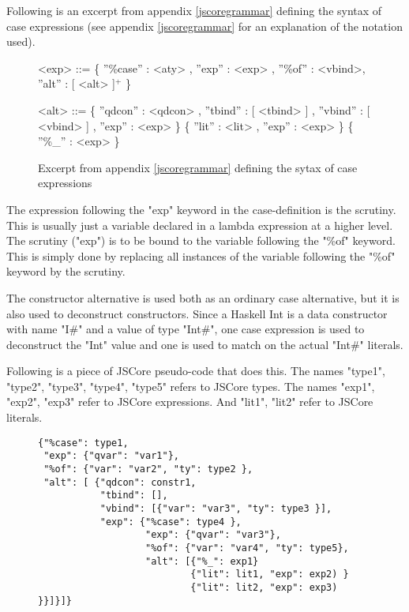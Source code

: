 Following is an excerpt from appendix \ref{jscoregrammar} defining the syntax 
of case expressions (see appendix \ref{jscoregrammar} for an explanation of the
notation used).

\begin{figure}[H]
\scriptsize
\begin{grammar}

<exp>		  ::= 	 \{ ''\%case'' : <aty> , ''exp'' : <exp> , ''\%of'' : <vbind>, ''alt'' : [ <alt> ]$^{+}$ \}	

<alt>		  ::= 	 \{ ''qdcon'' : <qdcon> , ''tbind'' : [ <tbind> ] , ''vbind'' : [ <vbind> ] , ''exp'' : <exp> \}
		  \alt 			 \{ ''lit'' : <lit> , ''exp'' : <exp> \}
		  \alt 			 \{ ''\%\_'' : <exp> \}	
\end{grammar}

\label{caseexpr}
\caption{Excerpt from appendix \ref{jscoregrammar} defining the sytax of case expressions}
\end{figure}

The expression following the "exp" keyword in the case-definition is the scrutiny. This
is usually just a variable declared in a lambda expression at a higher level.
The scrutiny ("exp") is to be bound to the variable following the "\%of" keyword.
This is simply done by replacing all instances of the variable following the "\%of" keyword
by the scrutiny.

The constructor alternative is used both as an ordinary case alternative, but it is
also used to deconstruct constructors. Since a Haskell Int is a data
constructor with name "I\#" and a value of type "Int\#", one case expression is used 
to deconstruct the "Int" value and one is used to match on the actual "Int\#" literals.

Following is a piece of JSCore pseudo-code that does this. 
The names "type1", "type2", "type3", "type4", "type5" refers to JSCore types. 
The names "exp1", "exp2", "exp3" refer to JSCore expressions. And "lit1", "lit2" refer
to JSCore literals.

\begin{figure}[H]
\lstset{ %
language=Haskell,
caption=JSCore case expression,
label=lst:int1
}
\begin{lstlisting}
{"%case": type1,
 "exp": {"qvar": "var1"},
 "%of": {"var": "var2", "ty": type2 },
 "alt": [ {"qdcon": constr1,
           "tbind": [],
           "vbind": [{"var": "var3", "ty": type3 }],
           "exp": {"%case": type4 },
                   "exp": {"qvar": "var3"},
                   "%of": {"var": "var4", "ty": type5},
                   "alt": [{"%_": exp1}
                           {"lit": lit1, "exp": exp2) }
                           {"lit": lit2, "exp": exp3) }}]}]}



\end{lstlisting}
\end{figure}

